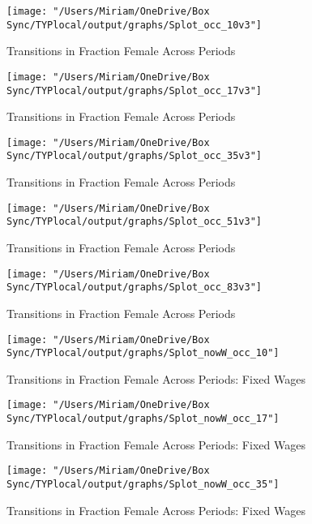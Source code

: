 \documentclass[11pt]{article}
\begin{document}
\begin{figure}[H]
\centering
\caption{Transitions in Fraction Female Across Periods}
\label{transitions10}
\texttt{[image: "/Users/Miriam/OneDrive/Box Sync/TYPlocal/output/graphs/Splot\_occ\_10v3"]}
\end{figure}

\begin{figure}[H]
\centering
\caption{Transitions in Fraction Female Across Periods}
\label{transitions17}
\texttt{[image: "/Users/Miriam/OneDrive/Box Sync/TYPlocal/output/graphs/Splot\_occ\_17v3"]}
\end{figure}

\begin{figure}[H]
\centering
\caption{Transitions in Fraction Female Across Periods}
\label{transitions35}
\texttt{[image: "/Users/Miriam/OneDrive/Box Sync/TYPlocal/output/graphs/Splot\_occ\_35v3"]}
\end{figure}

\begin{figure}[H]
\centering
\caption{Transitions in Fraction Female Across Periods}
\label{transitions51}
\texttt{[image: "/Users/Miriam/OneDrive/Box Sync/TYPlocal/output/graphs/Splot\_occ\_51v3"]}
\end{figure}

\begin{figure}[H]
\centering
\caption{Transitions in Fraction Female Across Periods}
\label{transitions83}
\texttt{[image: "/Users/Miriam/OneDrive/Box Sync/TYPlocal/output/graphs/Splot\_occ\_83v3"]}
\end{figure}

\begin{figure}[H]
\centering
\caption{Transitions in Fraction Female Across Periods: Fixed Wages}
\label{ftransitions10}
\texttt{[image: "/Users/Miriam/OneDrive/Box Sync/TYPlocal/output/graphs/Splot\_nowW\_occ\_10"]}
\end{figure}

\begin{figure}[H]
\centering
\caption{Transitions in Fraction Female Across Periods: Fixed Wages}
\label{ftransitions17}
\texttt{[image: "/Users/Miriam/OneDrive/Box Sync/TYPlocal/output/graphs/Splot\_nowW\_occ\_17"]}
\end{figure}

\begin{figure}[H]
\centering
\caption{Transitions in Fraction Female Across Periods: Fixed Wages}
\label{ftransitions35}
\texttt{[image: "/Users/Miriam/OneDrive/Box Sync/TYPlocal/output/graphs/Splot\_nowW\_occ\_35"]}
\end{figure}
\end{document}
